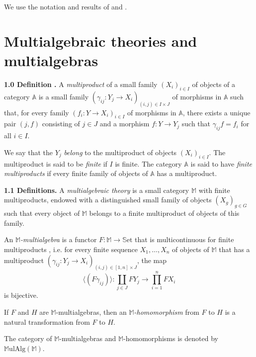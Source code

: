 \documentclass{article}
\newenvironment{rmenv}[1]
  {\phantomsection\par\medskip\noindent\textbf{#1.}\rmfamily}
  {\medskip}
\newcommand{\bb}[1]{{\mathbb{#1}}}
\newcommand{\Set}{\mathbb{S}\mathrm{et}}
\newcommand{\MulAlg}{\mathbb{M}\mathrm{ulAlg}}
\newcommand{\oldpage}[1]{\marginpar{\footnotesize$\Big\vert$ \textit{p.~#1}}}
\begin{document}
We use the notation and results of \cite{2} and \cite{3}.

\oldpage{194}
\section{Multialgebraic theories and multialgebras}

\begin{rmenv}{1.0 Definition \cite{2}}
\label{1.0}
  A \emph{multiproduct} of a small family $(X_i)_{i\in I}$ of objects of a category $\bb{A}$ is a small family $(\gamma_{ij}\colon Y_j\to X_i)_{(i,j)\in I\times J}$ of morphisms in $\bb{A}$ such that, for every family $(f_i\colon Y\to X_i)_{i\in I}$ of morphisms in $\bb{A}$, there exists a unique pair $(j,f)$ consisting of $j\in J$ and a morphism $f\colon Y\to Y_j$ such that $\gamma_{ij}f=f_i$ for all $i\in I$.

  We say that the $Y_j$ \emph{belong} to the multiproduct of objects $(X_i)_{i\in I}$.
  The multiproduct is said to be \emph{finite} if $I$ is finite.
  The category $\bb{A}$ is said to have \emph{finite multiproducts} if every finite family of objects of $\bb{A}$ has a multiproduct.
\end{rmenv}

\begin{rmenv}{1.1 Definitions}
\label{1.1}
  A \emph{multialgebraic theory} is a small category $\bb{M}$ with finite multiproducts, endowed with a distinguished small family of objects $(X_g)_{g\in G}$ such that every object of $\bb{M}$ belongs to a finite multiproduct of objects of this family.

  An \emph{$\bb{M}$-multialgebra} is a functor $F\colon\bb{M}\to\Set$ that is multicontinuous for finite multiproducts \cite{2}, i.e. for every finite sequence $X_1,\ldots,X_n$ of objects of $\bb{M}$ that has a multiproduct $(\gamma_{ij}\colon Y_j\to X_i)_{(i,j)\in[1,n]\times J}$, the map
  \[
    \langle(F\gamma_{ij})\rangle\colon
    \coprod_{j\in J} FY_j \to
    \prod_{i=1}^n FX_i
  \]
  is bijective.

  If $F$ and $H$ are $\bb{M}$-multialgebras, then an \emph{$\bb{M}$-homomorphism} from $F$ to $H$ is a natural transformation from $F$ to $H$.

  The category of $\bb{M}$-multialgebras and $\bb{M}$-homomorphisms is denoted by $\MulAlg(\bb{M})$.
\end{rmenv}
\end{document}
